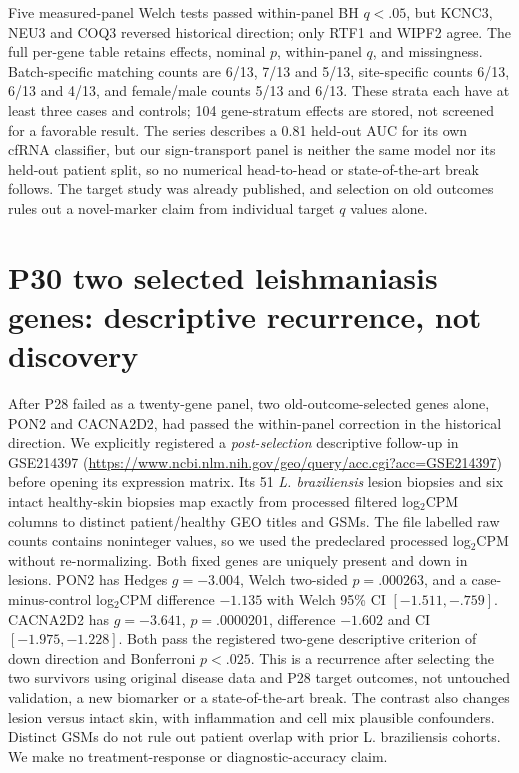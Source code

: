 \documentclass[11pt,a4paper]{article}
\begin{document}
Five measured-panel Welch tests passed within-panel BH $q<.05$, but KCNC3, NEU3 and COQ3 reversed historical direction; only RTF1 and WIPF2 agree. The full per-gene table retains effects, nominal $p$, within-panel $q$, and missingness. Batch-specific matching counts are 6/13, 7/13 and 5/13, site-specific counts 6/13, 6/13 and 4/13, and female/male counts 5/13 and 6/13. These strata each have at least three cases and controls; 104 gene-stratum effects are stored, not screened for a favorable result. The series describes a 0.81 held-out AUC for its own cfRNA classifier, but our sign-transport panel is neither the same model nor its held-out patient split, so no numerical head-to-head or state-of-the-art break follows. The target study was already published, and selection on old outcomes rules out a novel-marker claim from individual target $q$ values alone.

\section{P30 two selected leishmaniasis genes: descriptive recurrence, not discovery}
After P28 failed as a twenty-gene panel, two old-outcome-selected genes alone, PON2 and CACNA2D2, had passed the within-panel correction in the historical direction. We explicitly registered a \emph{post-selection} descriptive follow-up in GSE214397 (\url{https://www.ncbi.nlm.nih.gov/geo/query/acc.cgi?acc=GSE214397}) before opening its expression matrix. Its 51 \emph{L. braziliensis} lesion biopsies and six intact healthy-skin biopsies map exactly from processed filtered log$_2$CPM columns to distinct patient/healthy GEO titles and GSMs. The file labelled raw counts contains noninteger values, so we used the predeclared processed log$_2$CPM without re-normalizing. Both fixed genes are uniquely present and down in lesions. PON2 has Hedges $g=-3.004$, Welch two-sided $p=.000263$, and a case-minus-control log$_2$CPM difference $-1.135$ with Welch 95\% CI $[-1.511,-.759]$. CACNA2D2 has $g=-3.641$, $p=.0000201$, difference $-1.602$ and CI $[-1.975,-1.228]$. Both pass the registered two-gene descriptive criterion of down direction and Bonferroni $p<.025$. This is a recurrence after selecting the two survivors using original disease data and P28 target outcomes, not untouched validation, a new biomarker or a state-of-the-art break. The contrast also changes lesion versus intact skin, with inflammation and cell mix plausible confounders. Distinct GSMs do not rule out patient overlap with prior L. braziliensis cohorts. We make no treatment-response or diagnostic-accuracy claim.
\end{document}
